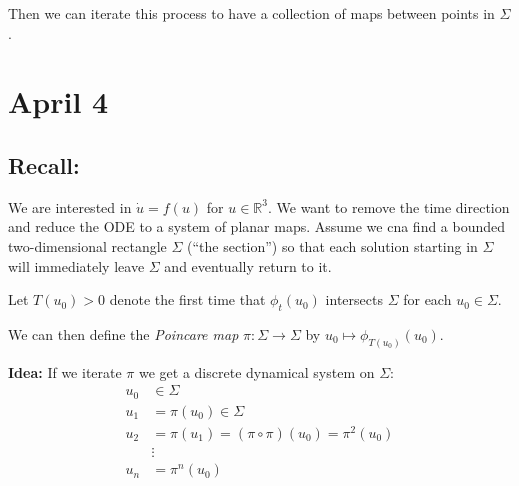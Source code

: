 \documentclass[12pt]{report}
\newcommand{\R}{\mathbb{R}}
\newcommand*{\tbf}[1]{\ifmmode\mathbf{#1}\else\textbf{#1}\fi}
\begin{document}
Then we can iterate this process to have a collection of maps between points in $\Sigma$.

\section{April 4}
\subsection{Recall:} We are interested in $\dot u = f(u)$ for $u \in \R^3$. We want to remove the time direction and reduce the ODE to a system of planar maps. Assume we cna find a bounded two-dimensional rectangle $\Sigma$ (``the section'') so that each solution starting in $\Sigma$ will immediately leave $\Sigma$ and eventually return to it.

Let $T(u_0) > 0$ denote the first time that $\phi_t(u_0)$ intersects $\Sigma$ for each $u_0 \in \Sigma$.

We can then define the \emph{Poincare map} $\pi: \Sigma \to \Sigma$ by $u_0 \mapsto \phi_{T(u_0)}(u_0)
$.

\tbf{Idea:} If we iterate $\pi$ we get a discrete dynamical system on $\Sigma$:
\begin{align*}
    u_0 & \in \Sigma                                     \\
    u_1 & = \pi(u_0) \in \Sigma                          \\
    u_2 & = \pi(u_1) = (\pi \circ \pi)(u_0) = \pi^2(u_0) \\
        & \vdots                                         \\
    u_n & = \pi^n(u_0)
\end{align*}

\begin{center}
\end{center}
\end{document}

